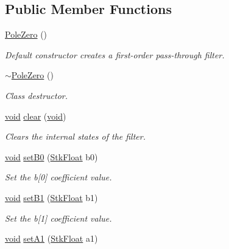 \subsection*{Public Member Functions}
\begin{DoxyCompactItemize}
\item 
\hyperlink{class_nyq_1_1_pole_zero_ace916a6813688cc8d26b812a201b1672}{Pole\+Zero} ()
\begin{DoxyCompactList}\small\item\em Default constructor creates a first-\/order pass-\/through filter. \end{DoxyCompactList}\item 
\hyperlink{class_nyq_1_1_pole_zero_a513c059d5dd442693d4d89835537dfa7}{$\sim$\+Pole\+Zero} ()
\begin{DoxyCompactList}\small\item\em Class destructor. \end{DoxyCompactList}\item 
\hyperlink{sound_8c_ae35f5844602719cf66324f4de2a658b3}{void} \hyperlink{class_nyq_1_1_pole_zero_a537cb9d4cbd09d015f0e964609c9a36c}{clear} (\hyperlink{sound_8c_ae35f5844602719cf66324f4de2a658b3}{void})
\begin{DoxyCompactList}\small\item\em Clears the internal states of the filter. \end{DoxyCompactList}\item 
\hyperlink{sound_8c_ae35f5844602719cf66324f4de2a658b3}{void} \hyperlink{class_nyq_1_1_pole_zero_a8054708e8a0243fc81a8995b92cb99bb}{set\+B0} (\hyperlink{namespace_nyq_a044fa20a706520a617bbbf458a7db7e4}{Stk\+Float} b0)
\begin{DoxyCompactList}\small\item\em Set the b\mbox{[}0\mbox{]} coefficient value. \end{DoxyCompactList}\item 
\hyperlink{sound_8c_ae35f5844602719cf66324f4de2a658b3}{void} \hyperlink{class_nyq_1_1_pole_zero_af5f2d0219550e59692488434a177fabc}{set\+B1} (\hyperlink{namespace_nyq_a044fa20a706520a617bbbf458a7db7e4}{Stk\+Float} b1)
\begin{DoxyCompactList}\small\item\em Set the b\mbox{[}1\mbox{]} coefficient value. \end{DoxyCompactList}\item 
\hyperlink{sound_8c_ae35f5844602719cf66324f4de2a658b3}{void} \hyperlink{class_nyq_1_1_pole_zero_ad61587cdf204abceb674df8cbb20d700}{set\+A1} (\hyperlink{namespace_nyq_a044fa20a706520a617bbbf458a7db7e4}{Stk\+Float} a1)

\end{DoxyCompactItemize}

